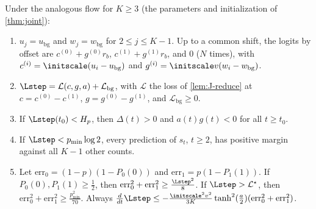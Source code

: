 \begin{lemma}
\label{lem:J-generalK}
Under the analogous flow for $K\ge3$ (the parameters and initialization of \cref{thm:joint}):
\begin{enumerate}[label=(\alph*),leftmargin=*,itemsep=2pt,topsep=3pt]
\item $u_j=u_{\mathrm{bg}}$ and $w_j=w_{\mathrm{bg}}$ for $2\le j\le K-1$. Up to a common shift, the logits by offset are $c^{(0)}+g^{(0)}r_b$, $c^{(1)}+g^{(1)}r_b$, and $0$
($N$ times), with $c^{(i)}=\initscale(u_i-u_{\mathrm{bg}})$ and $g^{(i)}=\initscale v(w_i-w_{\mathrm{bg}})$.
\item $\Lstep=\mathcal L(c,g,a)+\mathcal L_{\mathrm{bg}}$, with $\mathcal L$ the loss of \cref{lem:J-reduce} at $c=c^{(0)}-c^{(1)}$, $g=g^{(0)}-g^{(1)}$, and $\mathcal L_{\mathrm{bg}}\ge0$.
\item If $\Lstep(t_0)<H_p$, then $\Delta(t)>0$ and $a(t)g(t)<0$ for all $t\ge t_0$.
\item If $\Lstep<p_{\min}\log2$, every prediction of $s_t$, $t\ge2$, has positive margin against all $K-1$ other counts.
\item Let $\mathrm{err}_0=(1-p)(1-P_0(0))$ and $\mathrm{err}_1=p(1-P_1(1))$. If $P_0(0),P_1(1)\ge\frac{1}{2}$, then $\mathrm{err}_0^2+\mathrm{err}_1^2\ge\frac{\Lstep^2}{8}$. If $\Lstep>\mathcal L^\star$, then
$\mathrm{err}_0^2+\mathrm{err}_1^2\ge \frac{p_{\min}^2}{70}$. Always $\frac{d}{dt}\Lstep\le-\frac{\initscale^2v^2}{3K}\tanh^2(\frac{a}{2})(\mathrm{err}_0^2+\mathrm{err}_1^2)$.
\end{enumerate}
\end{lemma}

